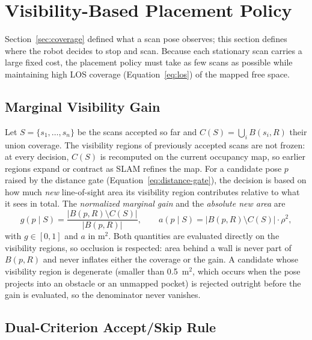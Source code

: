 \section{Visibility-Based Placement Policy}
\label{sec:placement}

Section~\ref{sec:coverage} defined what a scan pose observes; this section
defines where the robot decides to stop and scan. Because each stationary scan
carries a large fixed cost, the placement policy must take as few scans as
possible while maintaining high LOS coverage (Equation~\ref{eq:los}) of the
mapped free space.

\subsection{Marginal Visibility Gain}
\label{subsec:gain}

Let $S=\{s_1,\dots,s_n\}$ be the scans accepted so far and
$C(S)=\bigcup_i B(s_i,R)$ their union coverage. The visibility regions of
previously accepted scans are not frozen: at every decision, $C(S)$ is
recomputed on the current occupancy map, so earlier regions expand or contract
as SLAM refines the map. For a candidate pose $p$ raised by the distance gate
(Equation~\ref{eq:distance-gate}), the decision is based on how much \emph{new}
line-of-sight area its visibility region contributes relative to what it sees
in total. The \emph{normalized marginal gain} and the \emph{absolute new
area} are
\begin{equation}
g(p\mid S)=\frac{\lvert B(p,R)\setminus C(S)\rvert}{\lvert B(p,R)\rvert},
\qquad
a(p\mid S)=\lvert B(p,R)\setminus C(S)\rvert\cdot\rho^2,
\label{eq:gain}
\end{equation}
with $g\in[0,1]$ and $a$ in m$^2$. Both quantities are evaluated directly on
the visibility regions, so occlusion is respected: area behind a wall is never
part of $B(p,R)$ and never inflates either the coverage or the gain. A
candidate whose visibility region is degenerate (smaller than 0.5~m$^2$, which
occurs when the pose projects into an obstacle or an unmapped pocket) is
rejected outright before the gain is evaluated, so the denominator never
vanishes.

\subsection{Dual-Criterion Accept/Skip Rule}
\label{subsec:dual}

